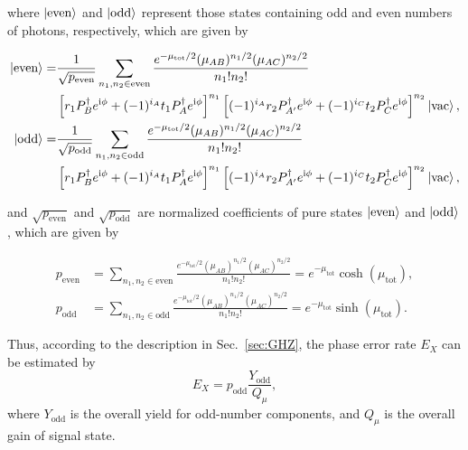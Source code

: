 \documentclass[aps,twocolumn,superscriptaddress,showpacs,nofootinbib]{revtex4-2}
\renewcommand{\i}{\mathrm{i}}
\begin{document}
\begin{widetext}
where $\ket{\text{even}}$ and $\ket{\text{odd}}$ represent those states containing odd and even numbers of photons, respectively, which are given by

\begin{equation}
\begin{split}
\ket{\text{even}} = &\frac{1}{\sqrt{p_{\text{even}}}} \sum_{n_1,n_2 \in \text{even}} \frac{e^{-\mu_\text{tot}/2}(\mu_{AB})^{n_1/2}(\mu_{AC})^{n_2/2}}{n_1!n_2!}\\
&\left[ r_1 P^\dagger_B e^{\i \phi}+ (-1)^{i_A} t_1 P^\dagger_{A} e^{\i \phi} \right]^{n_1} \left[ (-1)^{i_A} r_2 P^\dagger_{A'} e^{\i \phi} + (-1)^{i_C} t_2 P^\dagger_C e^{\i \phi} \right]^{n_2} \ket{\text{vac}},\\
\ket{\text{odd}} = &\frac{1}{\sqrt{p_{\text{odd}}}} \sum_{n_1,n_2 \in \text{odd}} \frac{e^{-\mu_\text{tot}/2}(\mu_{AB})^{n_1/2}(\mu_{AC})^{n_2/2}}{n_1!n_2!}\\
&\left[ r_1 P^\dagger_B e^{\i \phi}+ (-1)^{i_A} t_1 P^\dagger_{A} e^{\i \phi} \right]^{n_1} \left[ (-1)^{i_A} r_2 P^\dagger_{A'} e^{\i \phi} + (-1)^{i_C} t_2 P^\dagger_C e^{\i \phi} \right]^{n_2} \ket{\text{vac}},\\
\end{split}
\end{equation}

and $\sqrt{p_\text{even}}$ and $\sqrt{p_\text{odd}}$ are normalized coefficients of pure states $\ket{\text{even}}$ and $\ket{\text{odd}}$, which are given by

\begin{equation}
\begin{split}
p_{\text{even}} &= \sum_{n_1,n_2 \in \text{even}} \frac{e^{-\mu_\text{tot}/2}(\mu_{AB})^{n_1/2}(\mu_{AC})^{n_2/2}}{n_1!n_2!} = e^{-\mu_\text{tot}} \cosh{(\mu_\text{tot})},\\
p_{\text{odd}} &= \sum_{n_1,n_2 \in \text{odd}} \frac{e^{-\mu_\text{tot}/2}(\mu_{AB})^{n_1/2}(\mu_{AC})^{n_2/2}}{n_1!n_2!} = e^{-\mu_\text{tot}} \sinh{(\mu_\text{tot})}.
\end{split}
\end{equation}
\end{widetext}

Thus, according to the description in Sec.~\ref{sec:GHZ}, the phase error rate $E_{X}$ can be estimated by
\begin{equation} \label{eq:phase_error}
E_{X} = p_\text{odd} \frac{Y_\text{odd}}{Q_\mu},
\end{equation}
where $Y_\text{odd}$ is the overall yield for odd-number components, and $Q_\mu$ is the overall gain of signal state.
\end{document}
